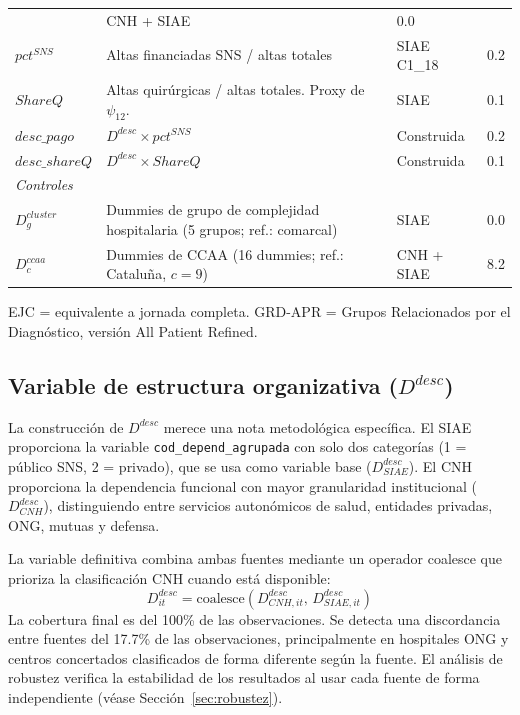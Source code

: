 \documentclass[12pt, a4paper]{article}
\begin{document}
\begin{table}[h!]
\begin{threeparttable}
\begin{tabular}{p{2.5cm}p{5cm}p{2.5cm}p{2cm}}
  & CNH + SIAE & 0.0 \\
$pct^{SNS}$ & Altas financiadas SNS / altas totales
  & SIAE C1\_18 & 0.2 \\
$ShareQ$ & Altas quirúrgicas / altas totales.
  Proxy de $\psi_{12}$.
  & SIAE & 0.1 \\
$desc\_pago$ & $D^{desc} \times pct^{SNS}$
  & Construida & 0.2 \\
$desc\_shareQ$ & $D^{desc} \times ShareQ$
  & Construida & 0.1 \\[4pt]
\multicolumn{4}{l}{\textit{Controles}} \\
$D^{cluster}_g$ & Dummies de grupo de complejidad
  hospitalaria (5 grupos; ref.: comarcal)
  & SIAE & 0.0 \\
$D^{ccaa}_c$ & Dummies de CCAA (16 dummies;
  ref.: Cataluña, $c=9$)
  & CNH + SIAE & 8.2 \\
\bottomrule
\end{tabular}
\begin{tablenotes}
  \small
  \item EJC = equivalente a jornada completa.
    GRD-APR = Grupos Relacionados por el Diagnóstico,
    versión All Patient Refined.
\end{tablenotes}
\end{threeparttable}
\end{table}

\subsection{Variable de estructura organizativa ($D^{desc}$)}

La construcción de $D^{desc}$ merece una nota
metodológica específica. El SIAE proporciona la variable
\texttt{cod\_depend\_agrupada} con solo dos categorías
(1 = público SNS, 2 = privado), que se usa como variable
base ($D^{desc}_{SIAE}$). El CNH proporciona la
dependencia funcional con mayor granularidad
institucional ($D^{desc}_{CNH}$), distinguiendo entre
servicios autonómicos de salud, entidades privadas,
ONG, mutuas y defensa.

La variable definitiva combina ambas fuentes mediante
un operador coalesce que prioriza la clasificación CNH
cuando está disponible:
\begin{equation}
  D^{desc}_{it} = \text{coalesce}(D^{desc}_{CNH,it},\,
  D^{desc}_{SIAE,it})
\end{equation}
La cobertura final es del 100\% de las observaciones.
Se detecta una discordancia entre fuentes del 17.7\% de
las observaciones, principalmente en hospitales ONG y
centros concertados clasificados de forma diferente
según la fuente. El análisis de robustez verifica la
estabilidad de los resultados al usar cada fuente de
forma independiente (véase Sección~\ref{sec:robustez}).
\end{document}
